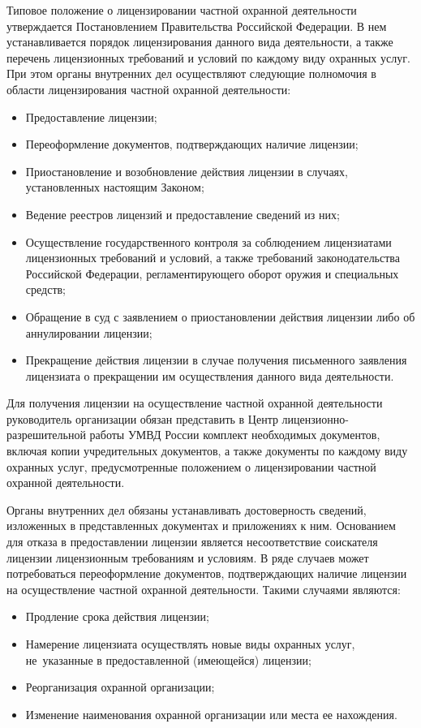 \documentclass[a4paper,12pt,fleqn]{article} %
\begin{document}
Типовое положение о лицензировании частной охранной деятельности утверждается Постановлением Правительства Российской Федерации. В нем устанавливается порядок лицензирования данного вида деятельности, а также перечень лицензионных требований и условий по каждому виду охранных услуг. При этом органы внутренних дел осуществляют следующие полномочия в области лицензирования частной охранной деятельности:

\begin{itemize}
	\item Предоставление лицензии;
	\item Переоформление документов, подтверждающих наличие лицензии;
	\item Приостановление и возобновление действия лицензии в случаях, установленных настоящим Законом;
	\item Ведение реестров лицензий и предоставление сведений из них;
	\item Осуществление государственного контроля за соблюдением лицензиатами лицензионных требований и условий, а также требований законодательства Российской Федерации, регламентирующего оборот оружия и специальных средств;
	\item Обращение в суд с заявлением о приостановлении действия лицензии либо об аннулировании лицензии;
	\item Прекращение действия лицензии в случае получения письменного заявления лицензиата о прекращении им осуществления данного вида деятельности.
\end{itemize}

Для получения лицензии на осуществление частной охранной деятельности руководитель организации обязан представить в Центр лицензионно-разрешительной работы УМВД России комплект необходимых документов, включая копии учредительных документов, а также документы по каждому виду охранных услуг, предусмотренные положением о лицензировании частной охранной деятельности.

Органы внутренних дел обязаны устанавливать достоверность сведений, изложенных в представленных документах и приложениях к ним. Основанием для отказа в предоставлении лицензии является несоответствие соискателя лицензии лицензионным требованиям и условиям. В ряде случаев может потребоваться переоформление документов, подтверждающих наличие лицензии на осуществление частной охранной деятельности. Такими случаями являются:

\begin{itemize}
	\item Продление срока действия лицензии;
	\item Намерение лицензиата осуществлять новые виды охранных услуг, не~указанные в предоставленной (имеющейся) лицензии;
	\item Реорганизация охранной организации;
	\item Изменение наименования охранной организации или места ее нахождения.
\end{itemize}
\end{document}

